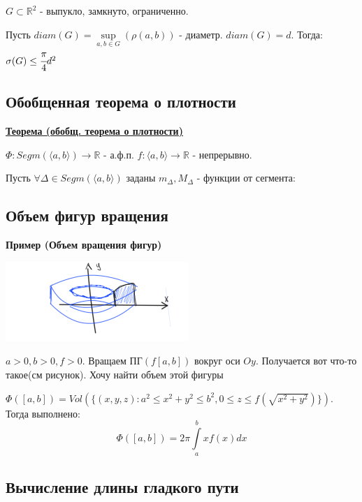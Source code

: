 \documentclass{article}
\newcommand{\integral}[2]{\displaystyle\int\limits_{#1}^{#2}}
\newcommand{\thmm}[1]{\underline{\textbf{#1}}}
\begin{document}
$G \subset \mathbb{R}^2$ - выпукло, замкнуто, ограниченно. 

Пусть $diam(G) = \sup\limits_{a,b\in G} (\rho(a,b))$ - диаметр. $diam(G) = d$. Тогда: $\sigma(G)\leq \cfrac{\pi}{4}d^2$

\subsection{Обобщенная теорема о плотности}

\thmm{Теорема (обобщ. теорема о плотности)}

$\varPhi: Segm(\langle a,b\rangle) \rightarrow \mathbb{R}$ - а.ф.п. $f: \langle a,b \rangle \rightarrow \mathbb{R}$ - непрерывно.

Пусть $\forall\Delta \in Segm(\langle a,b \rangle)$ заданы $m_\Delta, M_{\Delta} $ - функции от сегмента:


\subsection{Объем фигур вращения}

\textbf{Пример (Объем вращения фигур)}

\begin{center}
   \includegraphics[width = 10 cm]{assets/integral-v-figure.png}
\end{center}

$a>0,b>0, f>0$. Вращаем ПГ$(f[a,b])$ вокруг оси $Oy$. Получается вот что-то такое(см рисунок). Хочу найти объем этой фигуры 

$\varPhi([a,b]) = Vol(\{(x,y,z): a^2\leq x^2 + y^2 \leq b^2, 0\leq z \leq f(\sqrt{x^2+y^2})\})$. Тогда выполнено:
$$\varPhi([a,b]) = 2\pi \integral{a}{b}xf(x)dx$$

\subsection{Вычисление длины гладкого пути}
\end{document}
